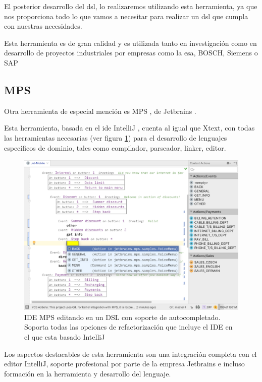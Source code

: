 El posterior desarrollo del \gls{dsl}, lo realizaremos utilizando esta herramienta, ya que nos proporciona todo lo que vamos a necesitar para realizar un \gls{dsl} que cumpla con nuestras necesidades.

Esta herramienta es de gran calidad y es utilizada tanto en investigación como en desarrollo de proyectos industriales por empresas como la \gls{esa}, BOSCH, Siemens o SAP \cite{xtext}


\subsection{MPS}

Otra herramienta de especial mención es MPS \cite{mps}, de Jetbrains \cite{jetbrains}.

Esta herramienta, basada en el \gls{ide} IntelliJ \cite{intellijidea}, cuenta al igual que Xtext, con todas las herramientas necesarias (ver figura \ref{fig:mps_editor_dsl}) para el desarrollo de lenguajes específicos de dominio, tales como compilador, parseador, linker, editor.

\begin{figure}
	\centering
    \includegraphics[height=0.3\textheight]{images/estado_cuestion/mps-language-support.png}
    \caption[IDE MPS editando un DSL]{IDE MPS editando en un DSL con soporte de autocompletado. Soporta todas las opciones de refactorización que incluye el IDE en el que esta basado IntelliJ}
    \label{fig:mps_editor_dsl}
\end{figure}

Los aspectos destacables de esta herramienta son una integración completa con el editor IntelliJ, soporte profesional por parte de la empresa Jetbrains e incluso formación en la herramienta y desarrollo del lenguaje.

